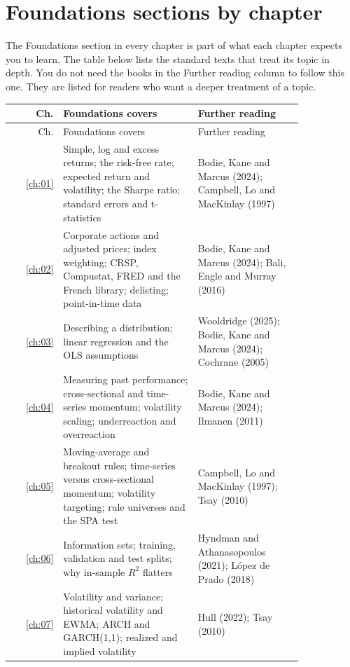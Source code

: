 \section*{Foundations sections by chapter}

The Foundations section in every chapter is part of what each chapter expects you to learn.
The table below lists the standard texts that treat its topic in depth. You do not need the books in the Further reading column to follow this one. They are listed for readers who want a deeper treatment of a topic.

\begingroup
\small
\setlength{\LTpre}{6pt}\setlength{\LTpost}{6pt}
\begin{longtable}{@{}r>{\raggedright\arraybackslash}p{0.468\linewidth}>{\raggedright\arraybackslash}p{0.364\linewidth}@{}}
\toprule
Ch. & Foundations covers & Further reading \\
\midrule
\endfirsthead
\toprule
Ch. & Foundations covers & Further reading \\
\midrule
\endhead
\bottomrule
\endlastfoot
\ref{ch:01} & Simple, log and excess returns; the risk-free rate; expected return and volatility; the Sharpe ratio; standard errors and t-statistics & Bodie, Kane and Marcus (2024); Campbell, Lo and MacKinlay (1997) \\
\ref{ch:02} & Corporate actions and adjusted prices; index weighting; CRSP, Compustat, FRED and the French library; delisting; point-in-time data & Bodie, Kane and Marcus (2024); Bali, Engle and Murray (2016) \\
\ref{ch:03} & Describing a distribution; linear regression and the OLS assumptions & Wooldridge (2025); Bodie, Kane and Marcus (2024); Cochrane (2005) \\
\ref{ch:04} & Measuring past performance; cross-sectional and time-series momentum; volatility scaling; underreaction and overreaction & Bodie, Kane and Marcus (2024); Ilmanen (2011) \\
\ref{ch:05} & Moving-average and breakout rules; time-series versus cross-sectional momentum; volatility targeting; rule universes and the SPA test & Campbell, Lo and MacKinlay (1997); Tsay (2010) \\
\ref{ch:06} & Information sets; training, validation and test splits; why in-sample $R^2$ flatters & Hyndman and Athanasopoulos (2021); L\'opez de Prado (2018) \\
\ref{ch:07} & Volatility and variance; historical volatility and EWMA; ARCH and GARCH(1,1); realized and implied volatility & Hull (2022); Tsay (2010) \\

\end{longtable}
